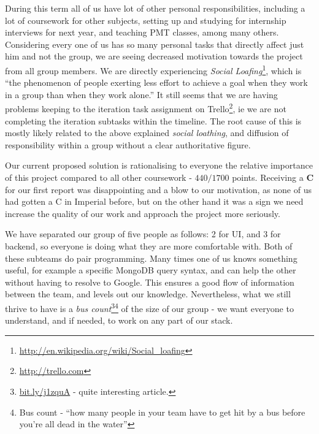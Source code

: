 \documentclass[a4paper,12pt]{article}
\begin{document}
	During this term all of us have lot of other personal responsibilities, including a lot of coursework for other subjects, setting up and studying for internship interviews for next year, and teaching PMT classes, among many others. Considering every one of us has so many personal tasks that directly affect just him and not the group, we are seeing decreased motivation towards the project from all group members. We are directly experiencing \emph{Social Loafing}\footnote{\url{http://en.wikipedia.org/wiki/Social_loafing}}, which is ``the phenomenon of people exerting less effort to achieve a goal when they work in a group than when they work alone.'' It still seems that we are having problems keeping to the iteration task assignment on Trello\footnote{\url{http://trello.com}}, ie we are not completing the iteration subtasks within the timeline. The root cause of this is mostly likely related to the above explained \emph{social loathing}, and diffusion of responsibility within a group without a clear authoritative figure.
	
	Our current proposed solution is rationalising to everyone the relative importance of this project compared to all other coursework - $440/1700$ points. Receiving a \textbf{C} for our first report was disappointing and a blow to our motivation, as none of us had gotten a C in Imperial before, but on the other hand it was a sign we need increase the quality of our work and approach the project more seriously.
	
	We have separated our group of five people as follows: 2 for UI, and 3 for backend, so everyone is doing what they are more comfortable with. Both of these subteams do pair programming. Many times one of us knows something useful, for example a specific MongoDB query syntax, and can help the other without having to resolve to Google. This ensures a good flow of information between the team, and levels out our knowledge. Nevertheless, what we still thrive to have is a \emph{bus count}\footnote{\url{bit.ly/j1zquA} - quite interesting article.}\footnote{Bus count - ``how many people in your team have to get hit by a bus before you’re all dead in the water''} of the size of our group - we want everyone to understand, and if needed, to work on any part of our stack.
	
\end{document}
